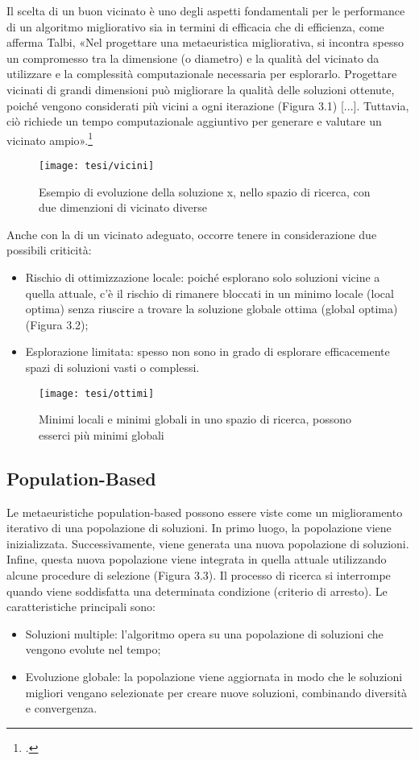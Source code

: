 Il scelta di un buon vicinato è uno degli aspetti fondamentali per le performance di un algoritmo migliorativo sia in termini di efficacia che di efficienza, come afferma Talbi, «Nel progettare una metaeuristica migliorativa, si incontra spesso un compromesso tra la dimensione (o diametro) e la qualità del vicinato da utilizzare e la complessità computazionale necessaria per esplorarlo. Progettare vicinati di grandi dimensioni può migliorare la qualità delle soluzioni ottenute, poiché vengono considerati più vicini a ogni iterazione (Figura 3.1) [...]. Tuttavia, ciò richiede un tempo computazionale aggiuntivo per generare e valutare un vicinato ampio».\footcite{talbi:ssb}
\begin{figure}[!ht] 
    \centering 
    \texttt{[image: tesi/vicini]} 
    \caption{Esempio di evoluzione della soluzione x, nello spazio di ricerca, con due dimenzioni di vicinato diverse}
\end{figure}

Anche con la di un vicinato adeguato, occorre tenere in considerazione due possibili criticità:
\begin{itemize}
    \item Rischio di ottimizzazione locale: poiché esplorano solo soluzioni vicine a quella attuale, c'è il rischio di rimanere bloccati in un minimo locale (local optima) senza riuscire a trovare la soluzione globale ottima (global optima) (Figura 3.2);
    \item Esplorazione limitata: spesso non sono in grado di esplorare efficacemente spazi di soluzioni vasti o complessi.
\end{itemize}

\begin{figure}[!ht] 
    \centering 
    \texttt{[image: tesi/ottimi]} 
    \caption{Minimi locali e minimi globali in uno spazio di ricerca, possono esserci più minimi globali}
\end{figure}

\subsection{Population-Based}

Le metaeuristiche population-based possono essere viste come un miglioramento iterativo di una popolazione di soluzioni. In primo luogo, la popolazione viene inizializzata. Successivamente, viene generata una nuova popolazione di soluzioni. Infine, questa nuova popolazione viene integrata in quella attuale utilizzando alcune procedure di selezione (Figura 3.3). Il processo di ricerca si interrompe quando viene soddisfatta una determinata condizione (criterio di arresto). %
Le caratteristiche principali sono:
\begin{itemize}
    \item Soluzioni multiple: l'algoritmo opera su una popolazione di soluzioni che vengono evolute nel tempo;
    \item Evoluzione globale: la popolazione viene aggiornata in modo che le soluzioni migliori vengano selezionate per creare nuove soluzioni, combinando diversità e convergenza.
\end{itemize}

